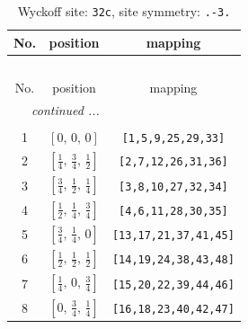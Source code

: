 \documentclass[fleqn,8pt]{jsarticle}
\begin{document}
\begin{longtable}{ccc}
\caption{Wyckoff site: {\tt 32c}, site symmetry: {\tt .-3.}}
 \\
 \hline \hline
No. & position & mapping \\ \hline \endfirsthead

\multicolumn{2}{l}{\tablename\ \thetable{}} \\
 \hline \hline
No. & position & mapping \\ \hline \endhead

 \hline \hline
\multicolumn{2}{r}{\footnotesize\it continued ...} \\ \endfoot

 \hline \hline
\multicolumn{2}{r}{} \\ \endlastfoot

1 & $\left[ 0,\, 0,\, 0 \right]$ & {\tt [1,5,9,25,29,33]} \\ \hline
2 & $\left[ \frac{1}{4},\, \frac{3}{4},\, \frac{1}{2} \right]$ & {\tt [2,7,12,26,31,36]} \\ \hline
3 & $\left[ \frac{3}{4},\, \frac{1}{2},\, \frac{1}{4} \right]$ & {\tt [3,8,10,27,32,34]} \\ \hline
4 & $\left[ \frac{1}{2},\, \frac{1}{4},\, \frac{3}{4} \right]$ & {\tt [4,6,11,28,30,35]} \\ \hline
5 & $\left[ \frac{3}{4},\, \frac{1}{4},\, 0 \right]$ & {\tt [13,17,21,37,41,45]} \\ \hline
6 & $\left[ \frac{1}{2},\, \frac{1}{2},\, \frac{1}{2} \right]$ & {\tt [14,19,24,38,43,48]} \\ \hline
7 & $\left[ \frac{1}{4},\, 0,\, \frac{3}{4} \right]$ & {\tt [15,20,22,39,44,46]} \\ \hline
8 & $\left[ 0,\, \frac{3}{4},\, \frac{1}{4} \right]$ & {\tt [16,18,23,40,42,47]} \\
\end{longtable}
\renewcommand{\arraystretch}{1.2}
\end{document}
